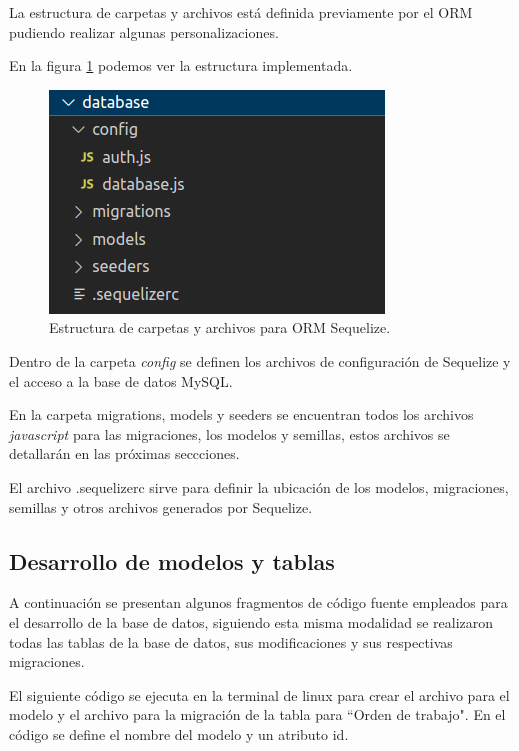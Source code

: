 La estructura de carpetas y archivos está definida previamente por el ORM pudiendo realizar algunas personalizaciones. 

En la figura \ref{fig:estructuraorm} podemos ver la estructura implementada.

\begin{figure}[h]
	\centering
	\includegraphics[scale=.50]{./Figures/estructuraorm.png}
	\caption{Estructura de carpetas y archivos para ORM Sequelize.}
	\label{fig:estructuraorm}
\end{figure}

Dentro de la carpeta \textit{config} se definen los archivos de configuración de Sequelize y el acceso a la base de datos MySQL.

En la carpeta migrations, models y seeders se encuentran todos los archivos \textit{javascript} para las migraciones, los modelos y semillas, estos archivos se detallarán en las próximas seccciones. 

El archivo .sequelizerc sirve para definir la ubicación de los modelos, migraciones, semillas y otros archivos generados por Sequelize.


\subsection{Desarrollo de modelos y tablas}
\label{subsec:modelobasededatos}



A continuación se presentan algunos fragmentos de código fuente empleados para el desarrollo de la base de datos, siguiendo esta misma modalidad se realizaron todas las tablas de la base de datos, sus modificaciones y sus respectivas migraciones.


El siguiente código se ejecuta en la terminal de linux para crear el archivo para el modelo y el archivo para la migración de la tabla para ``Orden de trabajo". En el código se define el nombre del modelo y un atributo id. 


